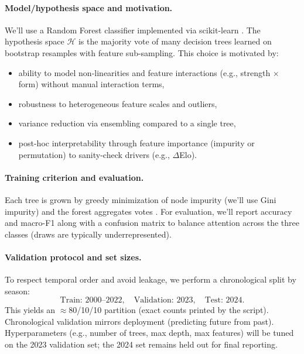 \documentclass[a4paper,12pt,twoside,english]{all-in-one}
\begin{document}
\paragraph{Model/hypothesis space and motivation.}
We'll use a Random Forest classifier \cite{breiman2001randomforests} implemented via scikit-learn \cite{pedregosa2011scikitlearn}. The hypothesis space \(\mathcal{H}\) is the majority vote of many decision trees learned on bootstrap resamples with feature sub-sampling. This choice is motivated by:
\begin{itemize}
  \item ability to model non-linearities and feature interactions (e.g., strength \(\times\) form) without manual interaction terms,
  \item robustness to heterogeneous feature scales and outliers,
  \item variance reduction via ensembling compared to a single tree,
  \item post-hoc interpretability through feature importance (impurity or permutation) to sanity-check drivers (e.g., \(\Delta\)Elo).
\end{itemize}

\paragraph{Training criterion and evaluation.}
Each tree is grown by greedy minimization of node impurity (we'll use Gini impurity) and the forest aggregates votes \cite{breiman2001randomforests}. For evaluation, we'll report accuracy and macro-F1 along with a confusion matrix to balance attention across the three classes (draws are typically underrepresented).

\paragraph{Validation protocol and set sizes.}
To respect temporal order and avoid leakage, we perform a chronological split by season:
\[
\text{Train: } 2000\text{--}2022,\quad
\text{Validation: } 2023,\quad
\text{Test: } 2024.
\]
This yields an \(\approx\)80/10/10 partition (exact counts printed by the script). Chronological validation mirrors deployment (predicting future from past). Hyperparameters (e.g., number of trees, max depth, max features) will be tuned on the 2023 validation set; the 2024 set remains held out for final reporting.

\clearpage
\pagestyle{\auxsettings}
\printbibliography[heading=bibintoc]
\end{document}
